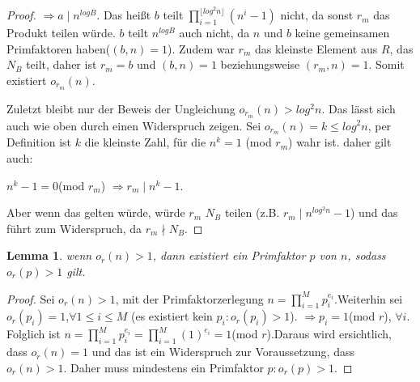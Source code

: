 \documentclass[12pt,oneside]{article}
\newtheorem{lemma}[theorem]{Lemma}
\theoremstyle{remark}
\theoremstyle{definition}
\begin{document}
\begin{proof}
$\Rightarrow a \mid n^{log B}$.\newline
Das heißt $b$ teilt $\prod_{i = 1}^{\lfloor log^2 n \rfloor}(n^i - 1)$ nicht, da sonst $r_{m}$ das Produkt teilen würde. $b$ teilt $n^{log B}$ auch nicht, da $n$ und $b$ keine gemeinsamen Primfaktoren haben($(b,n) = 1$). Zudem war $r_{m}$ das kleinste Element aus $R$, das $N_{B}$ teilt, daher ist $r_{m}= b$ und $(b,n) = 1$ beziehungsweise $(r_{m},n) = 1$. Somit existiert $o_{r_{m}}(n)$.\newline\newline

Zuletzt bleibt nur der Beweis der Ungleichung $o_{r_{m}}(n) > log^2 n$. Das lässt sich auch wie oben durch einen Widerspruch zeigen. Sei $o_{r_{m}}(n) = k \leq log^2 n$, per Definition ist $k$ die kleinste Zahl, für die $n^k = 1$ (mod $r_{m}$) wahr ist. daher gilt auch:\newline\newline
\centerline{$n^k - 1 = 0 $(mod  $r_{m}$) $\Rightarrow r_{m} \mid n^k - 1$.}

Aber wenn das gelten würde, würde $r_{m}$ $N_{B}$ teilen (z.B. $ r_{m} \mid n^{log^2 n} -1$) und das führt zum Widerspruch, da $r_{m} \nmid N_{B}$. 
\end{proof}

\smallskip

\begin{lemma}\label{ord_prime_l}
wenn $o_{r}(n) > 1$, dann existiert ein Primfaktor $p$ von $n$, sodass $o_{r}(p) > 1$ gilt. 
\end{lemma}
\begin{proof}
Sei $o_{r}(n) > 1$, mit der Primfaktorzerlegung $n = \prod_{i = 1}^{M} p_{i}^{e_{i}}$.\newline\newline Weiterhin sei $o_{r}(p_{i}) = 1$,$\forall 1 \leq i \leq M$ (es existiert kein $p_{i} : o_{r}(p_{i}) > 1$).\newline\newline
$\Rightarrow p_{i} = 1 $(mod $r$), $\forall i$. Folglich ist $n = \prod_{i = 1} ^{M} p_{i}^{e_{i}} = \prod_{i = 1} ^{M}(1)^{e_{i}} = 1 $(mod $r$).\newline\newline Daraus wird ersichtlich, dass $o_{r}(n) = 1$ und das ist ein Widerspruch zur Voraussetzung, dass $o_{r}(n) > 1$. Daher muss mindestens ein Primfaktor $p : o_{r}(p) > 1$.  
\end{proof}

\smallskip
\end{document}
